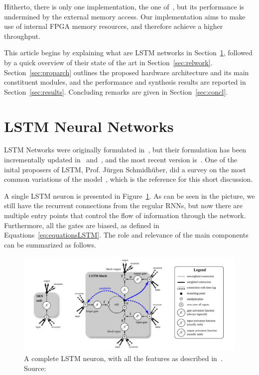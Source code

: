 \documentclass{IEEEtran}
\begin{document}
Hitherto, there is only one implementation, the one of~\cite{Chang15}, but its performance is undermined
by the external memory access. Our implementation aims to make use of internal FPGA memory resources,
and therefore achieve a higher throughput.

This article begins by explaining what are LSTM networks  in Section~\ref{sec:lstmnn}, followed by a quick overview of their state
of the art in Section~\ref{sec:relwork}. Section~\ref{sec:proparch} outlines the proposed
hardware architecture and its main constituent modules, and the performance and synthesis
results are reported in Section~\ref{sec:results}. Concluding remarks are given in
Section~\ref{sec:concl}.

\section{LSTM Neural Networks}\label{sec:lstmnn}
LSTM Networks were originally formulated in~\cite{Hoch97}, but their formulation has been incrementally
updated in~\cite{Gers00} and~\cite{Gers2000}, and the most recent version is~\cite{Graves05}.
One of the inital proposers of LSTM, Prof. Jürgen Schmidhüber, did a survey on the most common variations
of the model~\cite{Greff15}, which is the reference for this short discussion.

A single LSTM neuron is presented in Figure~\ref{fig:lstmneuron}. As can be seen in the picture,
we still have the recurrent connections from the regular RNNs, but now there are multiple entry points
that control the flow of information through the network. Furthermore, all the
gates are biased, as defined in Equations~\ref{eq:equationsLSTM}. The role and relevance of the main components can
be summarized as follows.

\begin{figure}[!t]
	\centering
	\includegraphics[width=1.1\linewidth]{figures/lstmneuron.png}
    \caption{A complete LSTM neuron, with all the features as described in~\cite{Graves05}. Source:~\cite{Greff15}}
	\label{fig:lstmneuron}
\end{figure}
\end{document}
